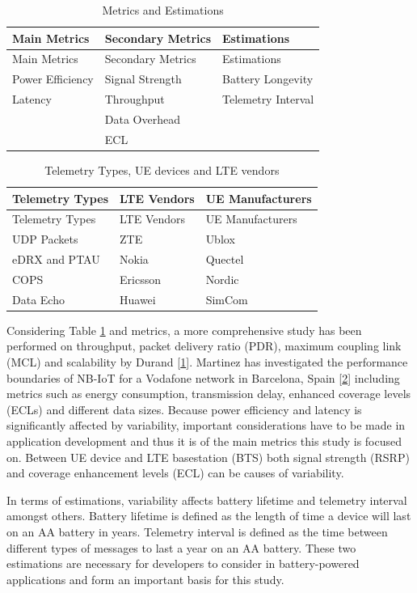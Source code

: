 \documentclass[]{article}
\begin{document}
\begin{longtable}[]{@{}lll@{}}
\caption{Metrics and Estimations
\label{tbl:metric_summary}}\tabularnewline
\toprule
Main Metrics & Secondary Metrics & Estimations\tabularnewline
\midrule
\endfirsthead
\toprule
Main Metrics & Secondary Metrics & Estimations\tabularnewline
\midrule
\endhead
Power Efficiency & Signal Strength & Battery Longevity\tabularnewline
Latency & Throughput & Telemetry Interval\tabularnewline
& Data Overhead &\tabularnewline
& ECL &\tabularnewline
\bottomrule
\end{longtable}

\begin{longtable}[]{@{}lll@{}}
\caption{Telemetry Types, UE devices and LTE vendors
\label{tbl:telemetry_ue_lte}}\tabularnewline
\toprule
Telemetry Types & LTE Vendors & UE Manufacturers\tabularnewline
\midrule
\endfirsthead
\toprule
Telemetry Types & LTE Vendors & UE Manufacturers\tabularnewline
\midrule
\endhead
UDP Packets & ZTE & Ublox\tabularnewline
eDRX and PTAU & Nokia & Quectel\tabularnewline
COPS & Ericsson & Nordic\tabularnewline
Data Echo & Huawei & SimCom\tabularnewline
\bottomrule
\end{longtable}

Considering Table \ref{tbl:metric_summary} and metrics, a more
comprehensive study has been performed on throughput, packet delivery
ratio (PDR), maximum coupling link (MCL) and scalability by Durand
{[}\protect\hyperlink{ref-Durand2019}{1}{]}. Martinez has investigated
the performance boundaries of NB-IoT for a Vodafone network in
Barcelona, Spain {[}\protect\hyperlink{ref-Martinez2019}{2}{]} including
metrics such as energy consumption, transmission delay, enhanced
coverage levels (ECLs) and different data sizes. Because power
efficiency and latency is significantly affected by variability,
important considerations have to be made in application development and
thus it is of the main metrics this study is focused on. Between UE
device and LTE basestation (BTS) both signal strength (RSRP) and
coverage enhancement levels (ECL) can be causes of variability.

In terms of estimations, variability affects battery lifetime and
telemetry interval amongst others. Battery lifetime is defined as the
length of time a device will last on an AA battery in years. Telemetry
interval is defined as the time between different types of messages to
last a year on an AA battery. These two estimations are necessary for
developers to consider in battery-powered applications and form an
important basis for this study.
\end{document}
